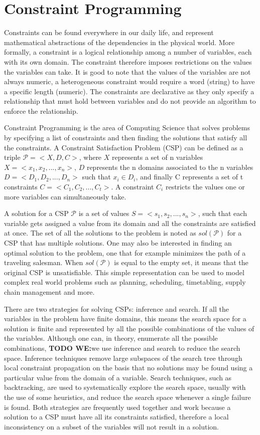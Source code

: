 \documentclass{l4proj}
\begin{document}
\section{Constraint Programming}
\noindent Constraints can be found everywhere in our daily life, and represent mathematical abstractions of the dependencies in the physical world. More formally, a constraint is a logical relationship among a number of variables, each with its own domain. The constraint therefore imposes restrictions on the values the variables can take. It is good to note that the values of the variables are not always numeric, a heterogeneous constraint would require a word (string) to have a specific length (numeric). The constraints are declarative as they only specify a relationship that must hold between variables and do not provide an algorithm to enforce the relationship.

\noindent Constraint Programming is the area of Computing Science that solves problems by specifying a list of constraints and then finding the solutions that satisfy all the constraints.
A Constraint Satisfaction Problem (CSP) can be defined as a triple $\mathcal{P} = <X, D, C>$, where $X$ represents a set of n variables $X = <x_1, x_2,..., x_n>$, $D$ represents the n domains associated to the n variables $D = <D_1, D_2,..., D_n>$ such that $x_i \in D_i$, and finally C represents a set of t constraints $C = <C_1, C_2,..., C_t>$. A constraint $C_i$ restricts the values one or more variables can simultaneously take.

\noindent A solution for a CSP $\mathcal{P}$ is a set of values $S = <s_1, s_2,..., s_n>$, such that each variable gets assigned a value from its domain and all the constraints are satisfied at once. The set of all the solutions to the problem is noted as $sol(\mathcal{P})$ for a CSP that has multiple solutions. One may also be interested in finding an optimal solution to the problem, one that for example minimizes the path of a traveling salesman. When $sol(\mathcal{P})$ is equal to the empty set, it means that the original CSP is unsatisfiable. This simple representation can be used to model complex real world problems such as planning, scheduling, timetabling, supply chain management and more.

\noindent There are two strategies for solving CSPs: inference and search. If all the variables in the problem have finite domains, this means the search space for a solution is finite and represented by all the possible combinations of the values of the variables. Although one can, in theory, enumerate all the possible combinations, \textbf{TODO WE:}we use inference and search to reduce the search space. Inference techniques remove large subspaces of the search tree through local constraint propagation on the basis that no solutions may be found using a particular value from the domain of a variable. Search techniques, such as backtracking, are used to systematically explore the search space, usually with the use of some heuristics, and reduce the search space whenever a single failure is found. Both strategies are frequently used together and work because a solution to a CSP must have all its constraints satisfied, therefore a local inconsistency on a subset of the variables will not result in a solution.
\end{document}
